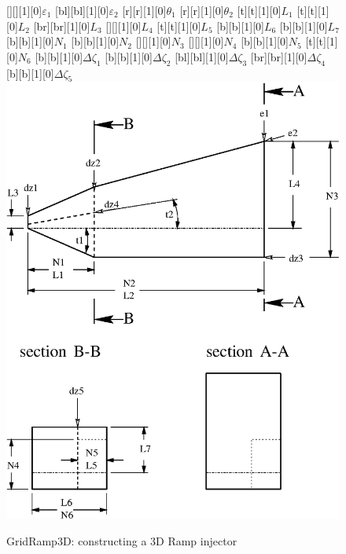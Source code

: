 %
\begin{figure}[h]
\vspace{0.3cm}
   \fontxfig
   [][][1][0]{$\varepsilon_1$}
   [bl][bl][1][0]{$\varepsilon_2$}
   [r][r][1][0]{$\theta_1$}
   [r][r][1][0]{$\theta_2$}
   [t][t][1][0]{$L_1$}
   [t][t][1][0]{$L_2$}
   [br][br][1][0]{$L_3$}
   [][][1][0]{$L_4$}
   [t][t][1][0]{$L_5$}
   [b][b][1][0]{$L_6$}
   [b][b][1][0]{$L_7$}
   [b][b][1][0]{$N_1$}
   [b][b][1][0]{$N_2$}
   [][][1][0]{$N_3$}
   [][][1][0]{$N_4$}
   [b][b][1][0]{$N_5$}
   [t][t][1][0]{$N_6$}
   [b][b][1][0]{$\Delta \zeta_1$}
   [b][b][1][0]{$\Delta \zeta_2$}
   [bl][bl][1][0]{$\Delta \zeta_3$}
   [br][br][1][0]{$\Delta \zeta_4$}
   [b][b][1][0]{$\Delta \zeta_5$}
   \includegraphics[width=6.0in]{gridRamp3D.eps}
\caption{GridRamp3D: constructing a 3D Ramp injector}
\label{fig:gridRamp3D}
\end{figure}
%

